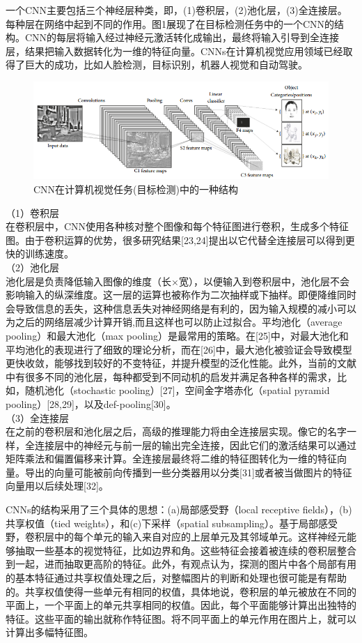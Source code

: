 \documentclass[a4paper]{article}
\begin{document}
一个CNN主要包括三个神经层种类，即，(1)卷积层，(2)池化层，(3)全连接层。每种层在网络中起到不同的作用。图1展现了在目标检测任务中的一个CNN的结构。CNN的每层将输入经过神经元激活转化成输出，最终将输入引导到全连接层，结果把输入数据转化为一维的特征向量。CNNs在计算机视觉应用领域已经取得了巨大的成功，比如人脸检测，目标识别，机器人视觉和自动驾驶。\\
\begin{figure}[ht]
	\centering
	\includegraphics[scale=0.6]{fig1.png}
	\caption{CNN在计算机视觉任务(目标检测)中的一种结构}
	\label{fig:label}
\end{figure}
（1）卷积层\\
在卷积层中，CNN使用各种核对整个图像和每个特征图进行卷积，生成多个特征图。由于卷积运算的优势，很多研究结果[23,24]提出以它代替全连接层可以得到更快的训练速度。\\
（2）池化层\\
池化层是负责降低输入图像的维度（长×宽），以便输入到卷积层中，池化层不会影响输入的纵深维度。这一层的运算也被称作为二次抽样或下抽样。即便降维同时会导致信息的丢失，这种信息丢失对神经网络是有利的，因为输入规模的减小可以为之后的网络层减少计算开销,而且这样也可以防止过拟合。平均池化（average pooling）和最大池化（max pooling）是最常用的策略。在[25]中，对最大池化和平均池化的表现进行了细致的理论分析，而在[26]中，最大池化被验证会导致模型更快收敛，能够找到较好的不变特征，并提升模型的泛化性能。此外，当前的文献中有很多不同的池化层，每种都受到不同动机的启发并满足各种各样的需求，比如，随机池化（stochastic pooling）[27]，空间金字塔赤化（spatial pyramid pooling）[28,29]，以及def-pooling[30]。\\
（3）全连接层\\
在之前的卷积层和池化层之后，高级的推理能力将由全连接层实现。像它的名字一样，全连接层中的神经元与前一层的输出完全连接，因此它们的激活结果可以通过矩阵乘法和偏置偏移来计算。全连接层最终将二维的特征图转化为一维的特征向量。导出的向量可能被前向传播到一些分类器用以分类[31]或者被当做图片的特征向量用以后续处理[32]。

CNNs的结构采用了三个具体的思想：(a)局部感受野（local receptive fields），(b)共享权值（tied weights），和(c)下采样（spatial subsampling）。基于局部感受野，卷积层中的每个单元的输入来自对应的上层单元及其邻域单元。这样神经元能够抽取一些基本的视觉特征，比如边界和角。这些特征会接着被连续的卷积层整合到一起，进而抽取更高阶的特征。此外，有观点认为，探测的图片中各个局部有用的基本特征通过共享权值处理之后，对整幅图片的判断和处理也很可能是有帮助的。共享权值使得一些单元有相同的权值，具体地说，卷积层的单元被放在不同的平面上，一个平面上的单元共享相同的权值。因此，每个平面能够计算出出独特的特征。这些平面的输出就称作特征图。将不同平面上的单元作用在图片上，就可以计算出多幅特征图。
\end{document}
